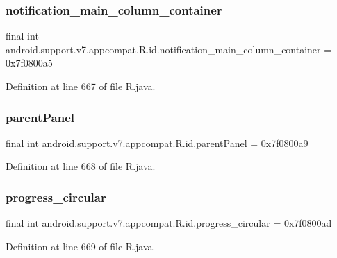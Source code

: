 \subsubsection{\texorpdfstring{notification\_main\_column\_container}{notification\_main\_column\_container}}
{\footnotesize\ttfamily final int android.\+support.\+v7.\+appcompat.\+R.\+id.\+notification\+\_\+main\+\_\+column\+\_\+container = 0x7f0800a5\hspace{0.3cm}{\ttfamily [static]}}



Definition at line 667 of file R.\+java.

\mbox{\label{classandroid_1_1support_1_1v7_1_1appcompat_1_1_r_1_1id_a908539fdb58bb6e7cbd117c4fa035dab}} 
\subsubsection{\texorpdfstring{parentPanel}{parentPanel}}
{\footnotesize\ttfamily final int android.\+support.\+v7.\+appcompat.\+R.\+id.\+parent\+Panel = 0x7f0800a9\hspace{0.3cm}{\ttfamily [static]}}



Definition at line 668 of file R.\+java.

\mbox{\label{classandroid_1_1support_1_1v7_1_1appcompat_1_1_r_1_1id_a78d6f86a1eb6df15a9a5c3b5afb779cf}} 
\subsubsection{\texorpdfstring{progress\_circular}{progress\_circular}}
{\footnotesize\ttfamily final int android.\+support.\+v7.\+appcompat.\+R.\+id.\+progress\+\_\+circular = 0x7f0800ad\hspace{0.3cm}{\ttfamily [static]}}



Definition at line 669 of file R.\+java.

